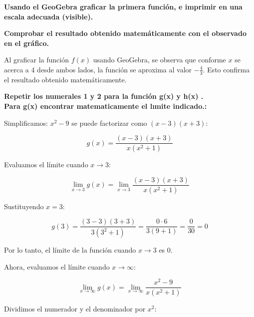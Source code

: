 \documentclass[answers]{exam} %
\begin{document}
\begin{questions}
\begin{solution}
	\end{solution}

	\vspace{0.5cm}
	\question \large\textbf{Usando el GeoGebra graficar la primera función, e imprimir en una escala adecuada
		(visible).}
	\begin{solution}
	\end{solution}

	\vspace{0.5cm}
	\question \large\textbf{Comprobar el resultado obtenido matemáticamente con el observado en el gráfico.}
	\begin{solution}
		Al graficar la función \( f(x) \) usando GeoGebra, se observa que conforme \( x \) se acerca a 4 desde ambos lados, la función se aproxima al valor \( -\frac{4}{3} \). Esto confirma el resultado obtenido matemáticamente.
	\end{solution}

	\vspace{0.5cm}
	\question \large\textbf{Repetir los numerales 1 y 2 para la función g(x) y h(x)
		.}\\[2em]
	\large\textbf{Para g(x) encontrar matematicamente el lımite indicado.:}

    \begin{solution}
        Simplificamos: \( x^2 - 9 \) se puede factorizar como \( (x - 3)(x + 3) \):
    
        \[
        g(x) = \frac{(x - 3)(x + 3)}{x(x^2 + 1)}
        \]
    
        Evaluamos el límite cuando \( x \rightarrow 3 \):
    
        \[
        \lim_{{x \to 3}} g(x) = \lim_{{x \to 3}} \frac{(x - 3)(x + 3)}{x(x^2 + 1)}
        \]
    
        Sustituyendo \( x = 3 \):
    
        \[
        g(3) = \frac{(3 - 3)(3 + 3)}{3(3^2 + 1)} = \frac{0 \cdot 6}{3(9 + 1)} = \frac{0}{30} = 0
        \]
    
        Por lo tanto, el límite de la función cuando \( x \rightarrow 3 \) es \( 0 \).
    
        Ahora, evaluamos el límite cuando \( x \rightarrow \infty \):
    
        \[
        \lim_{{x \to \infty}} g(x) = \lim_{{x \to \infty}} \frac{x^2 - 9}{x(x^2 + 1)}
        \]
    
        Dividimos el numerador y el denominador por \( x^2 \):
    

\end{solution}
\end{questions}
\end{document}
